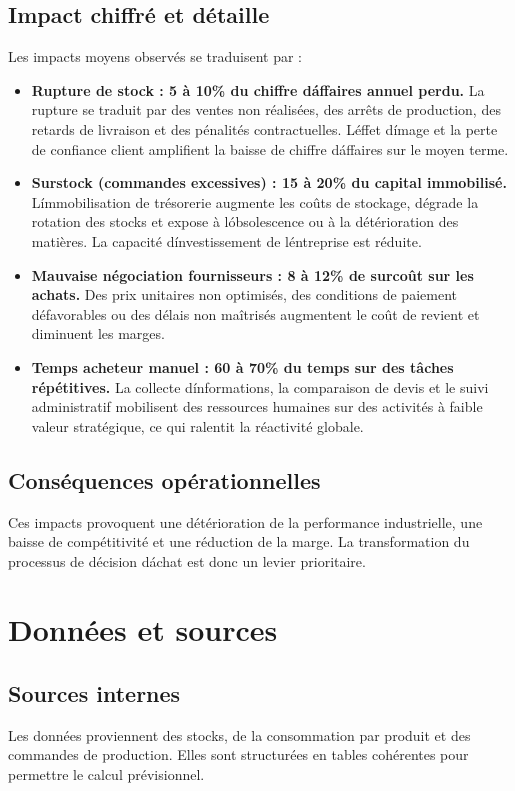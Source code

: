 \documentclass[12pt,a4paper]{report}
\begin{document}
\section{Impact chiffr\'e et d\'etaille}
Les impacts moyens observ\'es se traduisent par :
\begin{itemize}
  \item \textbf{Rupture de stock : 5 \`a 10\% du chiffre d\'affaires annuel perdu.} La rupture se traduit par des ventes non r\'ealis\'ees, des arr\^ets de production, des retards de livraison et des p\'enalit\'es contractuelles. L\'effet d\'image et la perte de confiance client amplifient la baisse de chiffre d\'affaires sur le moyen terme.
  \item \textbf{Surstock (commandes excessives) : 15 \`a 20\% du capital immobilis\'e.} L\'immobilisation de tr\'esorerie augmente les co\^uts de stockage, d\'egrade la rotation des stocks et expose \`a l\'obsolescence ou \`a la d\'et\'erioration des mati\`eres. La capacit\'e d\'investissement de l\'entreprise est r\'eduite.
  \item \textbf{Mauvaise n\'egociation fournisseurs : 8 \`a 12\% de surco\^ut sur les achats.} Des prix unitaires non optimis\'es, des conditions de paiement d\'efavorables ou des d\'elais non ma\^itris\'es augmentent le co\^ut de revient et diminuent les marges.
  \item \textbf{Temps acheteur manuel : 60 \`a 70\% du temps sur des t\^aches r\'ep\'etitives.} La collecte d\'informations, la comparaison de devis et le suivi administratif mobilisent des ressources humaines sur des activit\'es \`a faible valeur strat\'egique, ce qui ralentit la r\'eactivit\'e globale.
\end{itemize}

\section{Cons\'equences op\'erationnelles}
Ces impacts provoquent une d\'et\'erioration de la performance industrielle, une baisse de comp\'etitivit\'e et une r\'eduction de la marge. La transformation du processus de d\'ecision d\'achat est donc un levier prioritaire.

\cleardoublepage

\chapter{Donn\'ees et sources}
\section{Sources internes}
Les donn\'ees proviennent des stocks, de la consommation par produit et des commandes de production. Elles sont structur\'ees en tables coh\'erentes pour permettre le calcul pr\'evisionnel.
\end{document}
